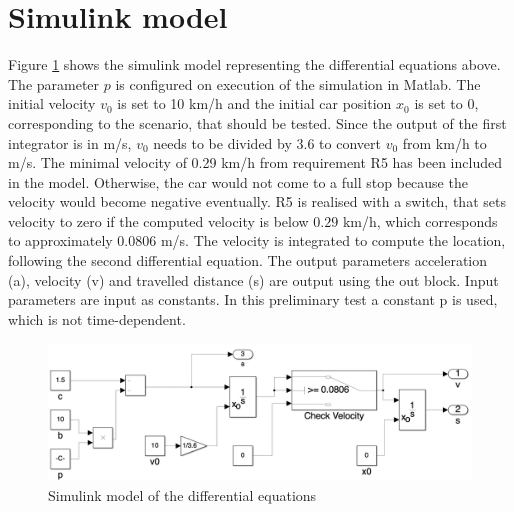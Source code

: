 \section{Simulink model}\label{sec:D2_model}
Figure \ref{fig:D2_Sim} shows the simulink model representing the differential equations above.
The parameter $p$ is configured on execution of the simulation in Matlab.
The initial velocity $v_0$ is set to 10 km/h and the initial car position $x_0$ is set to 0, corresponding to the scenario, that should be tested.
Since the output of the first integrator is in m/s, $v_0$ needs to be divided by $3.6$ to convert $v_0$ from km/h to m/s.
The minimal velocity of 0.29 km/h from requirement R5 has been included in the model.
Otherwise, the car would not come to a full stop because the velocity would become negative eventually.
R5 is realised with a switch, that sets velocity to zero if the computed velocity is below $0.29$ km/h, which corresponds to approximately $0.0806$ m/s.
The velocity is integrated to compute the location, following the second differential equation.
The output parameters acceleration (a), velocity (v) and travelled distance (s) are output using the out block.
Input parameters are input as constants.
In this preliminary test a constant p is used, which is not time-dependent.
\begin{figure}[H]
\centering
\includegraphics[width=1\textwidth]{images/D2_sim.png}
\caption{Simulink model of the differential equations}
\label{fig:D2_Sim}
\end{figure}

